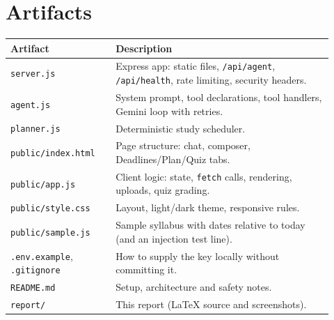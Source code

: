 \documentclass[11pt]{article}
\begin{document}
\section{Artifacts}
\begin{center}
\begin{tabular}{@{}p{0.3\linewidth}p{0.62\linewidth}@{}}
\toprule
\textbf{Artifact} & \textbf{Description} \\
\midrule
\texttt{server.js} & Express app: static files, \texttt{/api/agent}, \texttt{/api/health}, rate limiting, security headers. \\
\texttt{agent.js} & System prompt, tool declarations, tool handlers, Gemini loop with retries. \\
\texttt{planner.js} & Deterministic study scheduler. \\
\texttt{public/index.html} & Page structure: chat, composer, Deadlines/Plan/Quiz tabs. \\
\texttt{public/app.js} & Client logic: state, \texttt{fetch} calls, rendering, uploads, quiz grading. \\
\texttt{public/style.css} & Layout, light/dark theme, responsive rules. \\
\texttt{public/sample.js} & Sample syllabus with dates relative to today (and an injection test line). \\
\texttt{.env.example}, \texttt{.gitignore} & How to supply the key locally without committing it. \\
\texttt{README.md} & Setup, architecture and safety notes. \\
\texttt{report/} & This report (\LaTeX{} source and screenshots). \\
\bottomrule
\end{tabular}
\end{center}
\end{document}
